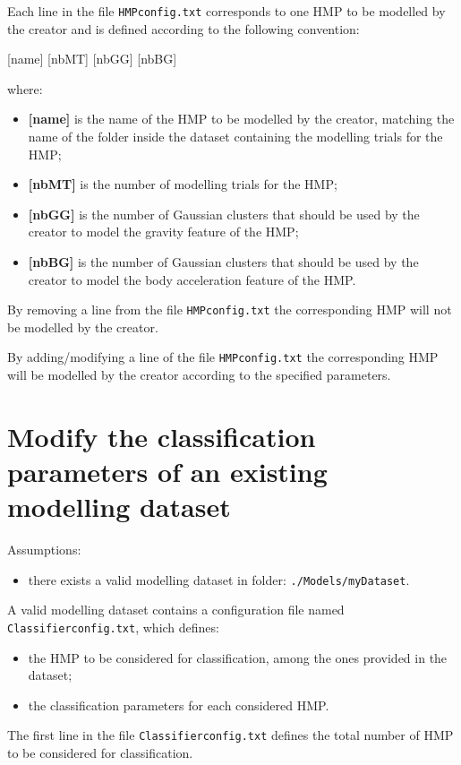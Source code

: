 \documentclass[10pt,a4paper]{report}
\begin{document}
Each line in the file \verb+HMPconfig.txt+ corresponds to one HMP to be modelled by the creator and is defined according to the following convention:
\begin{center}
[name] [nbMT] [nbGG] [nbBG]
\end{center}
where:
\begin{itemize}
\item \textbf{[name]} is the name of the HMP to be modelled by the creator, matching the name of the folder inside the dataset containing the modelling trials for the HMP;
\item \textbf{[nbMT]} is the number of modelling trials for the HMP;
\item \textbf{[nbGG]} is the number of Gaussian clusters that should be used by the creator to model the gravity feature of the HMP;
\item \textbf{[nbBG]} is the number of Gaussian clusters that should be used by the creator to model the body acceleration feature of the HMP.
\end{itemize}

By removing a line from the file \verb+HMPconfig.txt+ the corresponding HMP will not be modelled by the creator.

By adding/modifying a line of the file \verb+HMPconfig.txt+ the corresponding HMP will be modelled by the creator according to the specified parameters.

\section{Modify the classification parameters of an existing modelling dataset}
Assumptions:
\begin{itemize}
\item there exists a valid modelling dataset in folder: \verb+./Models/myDataset+.
\end{itemize}

A valid modelling dataset contains a configuration file named \verb+Classifierconfig.txt+, which defines:
\begin{itemize}
\item the HMP to be considered for classification, among the ones provided in the dataset;
\item the classification parameters for each considered HMP.
\end{itemize}

The first line in the file \verb+Classifierconfig.txt+ defines the total number of HMP to be considered for classification.
\end{document}
